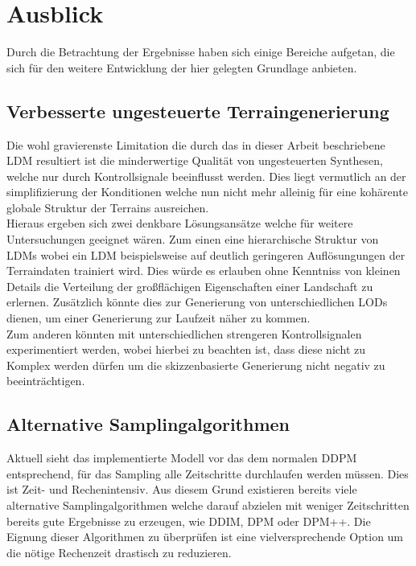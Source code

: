 \section{Ausblick}

Durch die Betrachtung der Ergebnisse haben sich einige Bereiche aufgetan, die sich für den weitere Entwicklung der hier gelegten Grundlage anbieten.  

\subsection{Verbesserte ungesteuerte Terraingenerierung}

Die wohl gravierenste Limitation die durch das in dieser Arbeit beschriebene LDM resultiert ist die minderwertige Qualität von ungesteuerten Synthesen, welche nur durch Kontrollsignale beeinflusst werden. Dies liegt vermutlich an der simplifizierung der Konditionen welche nun nicht mehr alleinig für eine kohärente globale Struktur der Terrains ausreichen. \\
Hieraus ergeben sich zwei denkbare Lösungsansätze welche für weitere Untersuchungen geeignet wären. Zum einen eine hierarchische Struktur von LDMs wobei ein LDM beispielsweise auf deutlich geringeren Auflösungungen der Terraindaten trainiert wird. Dies würde es erlauben ohne Kenntniss von kleinen Details die Verteilung der großflächigen Eigenschaften einer Landschaft zu erlernen. Zusätzlich könnte dies zur Generierung von unterschiedlichen LODs dienen, um einer Generierung zur Laufzeit näher zu kommen.\\
Zum anderen könnten mit unterschiedlichen strengeren Kontrollsignalen experimentiert werden, wobei hierbei zu beachten ist, dass diese nicht zu Komplex werden dürfen um die skizzenbasierte Generierung nicht negativ zu beeinträchtigen.  

\subsection{Alternative Samplingalgorithmen}

Aktuell sieht das implementierte Modell vor das dem normalen DDPM entsprechend, für das Sampling alle Zeitschritte durchlaufen werden müssen. Dies ist Zeit- und Rechenintensiv. Aus diesem Grund existieren bereits viele alternative Samplingalgorithmen welche darauf abzielen mit weniger Zeitschritten bereits gute Ergebnisse zu erzeugen, wie DDIM, DPM oder DPM++. Die Eignung dieser Algorithmen zu überprüfen ist eine vielversprechende Option um die nötige Rechenzeit drastisch zu reduzieren.

